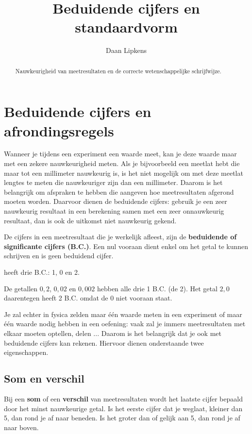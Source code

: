 \documentclass{ximera}
\title{Beduidende cijfers en standaardvorm}
\author{Daan Lipkens}
\begin{document}
\begin{abstract}
    Nauwkeurigheid van meetresultaten en de correcte wetenschappelijke schrijfwijze.
\end{abstract}
\maketitle

\section{Beduidende cijfers en afrondingsregels}
Wanneer je tijdens een experiment een waarde meet, kan je deze waarde maar met een zekere nauwkeurigheid meten. Als je bijvoorbeeld een meetlat hebt die maar tot een millimeter nauwkeurig is, is het niet mogelijk om met deze meetlat lengtes te meten die nauwkeuriger zijn dan een millimeter. Daarom is het belangrijk om afspraken te hebben die aangeven hoe meetresultaten afgerond moeten worden. Daarvoor dienen de beduidende cijfers: gebruik je een zeer nauwkeurig resultaat in een berekening samen met een zeer onnauwkeurig resultaat, dan is ook de uitkomst niet nauwkeurig gekend.

\begin{definition}\nl
    De cijfers in een meetresultaat die je werkelijk afleest, zijn de \textbf{beduidende of significante cijfers (B.C.)}. Een nul vooraan dient enkel om het getal te kunnen schrijven en is geen beduidend cijfer.
\end{definition}

\begin{example}[title={Aantal B.C.}] heeft drie B.C.: 1, 0 en 2.
\end{example}

\begin{example}[title={Aantal B.C.}]\nl
    De getallen $0{,}2$, $0{,}02$ en $0{,}002$ hebben alle drie 1 B.C. (de 2). Het getal $2{,}0$ daarentegen heeft 2 B.C. omdat de 0 niet vooraan staat.
\end{example}

Je zal echter in fysica zelden maar één waarde meten in een experiment of maar één waarde nodig hebben in een oefening: vaak zal je immers meetresultaten met elkaar moeten optellen, delen ... Daarom is het belangrijk dat je ook met beduidende cijfers kan rekenen. Hiervoor dienen onderstaande twee eigenschappen.

\subsection{Som en verschil}
\begin{proposition}\nl
    Bij een \textbf{som} of een \textbf{verschil} van meetresultaten wordt het laatste cijfer bepaald door het minst nauwkeurige getal. Is het eerste cijfer dat je weglaat, kleiner dan 5, dan rond je af naar beneden. Is het groter dan of gelijk aan 5, dan rond je af naar boven.
\end{proposition}
\end{document}

